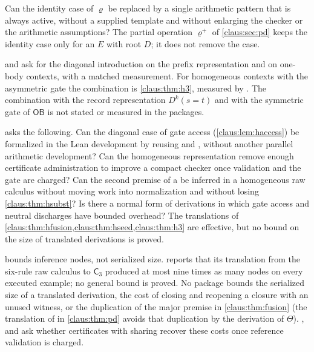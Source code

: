 \begin{question}
Can the identity case of $\varrho$ be replaced by a single arithmetic
pattern that is always active, without a supplied template and without
enlarging the checker or the arithmetic assumptions? The partial operation
$\varrho^{+}$ of \cref{claus:sec:pd} keeps the identity case only for an
$E$ with root $D$; it does not remove the case.
\end{question}

\begin{question}
 and  ask for the diagonal
introduction on the prefix representation and on one-body contexts, with
a matched measurement. For homogeneous contexts with the asymmetric gate
the combination is \cref{claus:thm:h3}, measured by
. The combination with the record
representation $D^k(s=t)$ and with the symmetric gate of $\mathsf{OB}$ is
not stated or measured in the packages.
\end{question}

\begin{question}
 asks the following. Can the diagonal case of
gate access (\cref{claus:lem:haccess}) be formalized in the Lean
development by reusing  and
, without another parallel arithmetic
development? Can the homogeneous representation remove enough certificate
administration to improve a compact checker once validation and the gate
are charged? Can the second premise of a  be inferred
in a homogeneous raw calculus without moving work into normalization and
without losing \cref{claus:thm:hsubst}? Is there a normal form of
derivations in which gate access and neutral discharges have bounded
overhead? The translations of
\cref{claus:thm:hfusion,claus:thm:hseed,claus:thm:h3} are effective, but
no bound on the size of translated derivations is proved.
\end{question}

\begin{question}
 bounds inference nodes, not serialized size.
 reports that its translation from the six-rule raw
calculus to $\mathsf{C}_3$ produced at most nine times as many nodes on
every executed example; no general bound is proved. No package bounds the
serialized size of a translated derivation, the cost of closing and
reopening a closure with an unused witness, or the duplication of the
major premise in \cref{claus:thm:fusion} (the translation of
 in \cref{claus:thm:pd} avoids that duplication by the
derivation of $\Theta$). ,
 and  ask
whether certificates with sharing recover these costs once reference
validation is charged.
\end{question}

